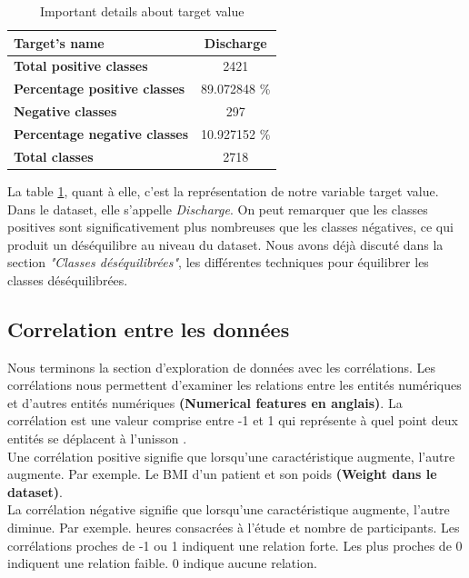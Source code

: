 \documentclass[12pt, french]{report}
\begin{document}
\begin{table}[h]
\centering
\begin{tabular}{| l | c |}
\hline
\textbf{Target's name} & Discharge \\
\hline
\textbf{Total positive classes} & 2421 \\
\hline
\textbf{Percentage positive classes} & 89.072848 \% \\
\hline
\textbf{Negative classes} & 297 \\
\hline
\textbf{Percentage negative classes} & 10.927152 \% \\
\hline
\textbf{Total classes} & 2718 \\

\hline
\end{tabular}
\caption{Important details about target value}
\label{tab:target}
\end{table}

La table \ref{tab:target}, quant à elle, c'est la représentation de notre variable target value. Dans le dataset, elle s'appelle \textit{Discharge}. On peut remarquer que les classes positives sont significativement plus nombreuses que les classes négatives, ce qui produit un déséquilibre au niveau du dataset. Nous avons déjà discuté dans la section\textit{ "Classes déséquilibrées"}, les différentes techniques pour équilibrer les classes déséquilibrées.

\subsection{Correlation entre les données}
Nous terminons la section d'exploration de données avec les corrélations. Les corrélations nous permettent d'examiner les relations entre les entités numériques et d'autres entités numériques \textbf{(Numerical features en anglais)}. La corrélation est une valeur comprise entre -1 et 1 qui représente à quel point deux entités se déplacent à l'unisson \cite{key20}. \\

Une corrélation positive signifie que lorsqu'une caractéristique augmente, l'autre augmente. Par exemple. Le BMI d'un patient et son poids\textbf{ (Weight dans le dataset)}.\\

La corrélation négative signifie que lorsqu'une caractéristique augmente, l'autre diminue. Par exemple. heures consacrées à l'étude et nombre de participants. Les corrélations proches de -1 ou 1 indiquent une relation forte. Les plus proches de 0 indiquent une relation faible. 0 indique aucune relation.
\end{document}
